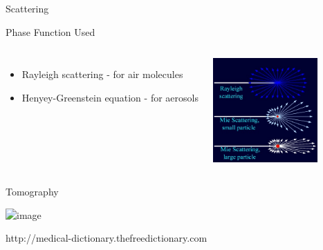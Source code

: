 \documentclass[compress,red,12pt]{beamer}
\begin{document}

\begin{frame}{Scattering}
    \begin{overprint}
      {\centerline{\def\svgwidth{0.5\linewidth}\small{}}}
      {\centerline{\def\svgwidth{0.5\linewidth}\small{}}}
      {\centerline{\def\svgwidth{0.5\linewidth}\small{}}}
    \end{overprint}  
\end{frame}


\begin{frame}[T]{Phase Function Used}
  \begin{columns}[T]
    \begin{itemize}
    \item Rayleigh scattering - for air molecules
    \item  Henyey-Greenstein equation - for aerosols
    \end{itemize}
    \centering
    \includegraphics[height=4cm]{images/Mie_Rayleigh.jpg}
  \end{columns}
\end{frame}


\begin{frame}{Tomography}
  \begin{center}
    \includegraphics<1>[height=6cm]{images/ct.png}
  \end{center}
  
  \begin{flushright}
     {\tiny http://medical-dictionary.thefreedictionary.com}
  \end{flushright}
\end{frame}

\end{document}
